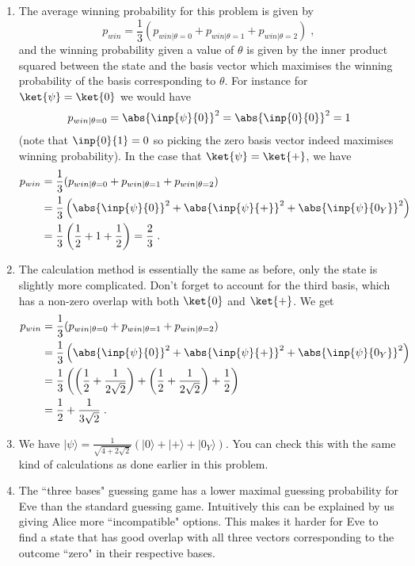 \begin{exercises}
\begin{enumerate}
\item The average winning probability for this problem is given by \[p_{win} = \frac{1}{3}(p_{win|\theta = 0} + p_{win|\theta = 1}+ p_{win|\theta = 2})\;,\] and the winning probability given a value of \(\theta\) is given by the inner product squared between the state and the basis vector which maximises the winning probability of the basis corresponding to \(\theta\). For instance for \(\ket{\psi} = \ket{0}\) we would have \[p_{win|\theta =0} = \abs{\inp{\psi}{0}}^2 = \abs{\inp{0}{0}}^2 = 1\] (note that \(\inp{0}{1}=0\) so picking the zero basis vector indeed maximises winning probability). In the case that $\ket{\psi}=\ket{+}$, we have
\begin{align*}
	p_{win} &= \frac{1}{3}(p_{win|\theta = 0} + p_{win|\theta = 1}+ p_{win|\theta = 2}) \\
	&=\frac{1}{3}\left(\abs{\inp{\psi}{0}}^2+\abs{\inp{\psi}{+}}^2+\abs{\inp{\psi}{0_Y}}^2 \right) \\
	&=\frac{1}{3}\left(\frac{1}{2}+1+\frac{1}{2} \right)=\frac{2}{3}\;.
\end{align*}

\item The calculation method is essentially the same as before, only the state is slightly more complicated. Don't forget to account for the third basis, which has a non-zero overlap with both \(\ket{0}\) and \(\ket{+}\). We get
\begin{align*}
	p_{win} &= \frac{1}{3}(p_{win|\theta = 0} + p_{win|\theta = 1}+ p_{win|\theta = 2}) \\
	&=\frac{1}{3}\left(\abs{\inp{\psi}{0}}^2+\abs{\inp{\psi}{+}}^2+\abs{\inp{\psi}{0_Y}}^2 \right) \\
	&=\frac{1}{3}\left(\left(\frac{1}{2}+\frac{1}{2\sqrt{2}}\right)+\left(\frac{1}{2}+\frac{1}{2\sqrt{2}}\right)+\frac{1}{2}\right) \\
	&=\frac{1}{2}+\frac{1}{3\sqrt{2}}\;.
\end{align*}

\item We have \(|\psi\rangle = \frac{1}{\sqrt{4+2\sqrt{2}}}(|0\rangle +|+\rangle +|0_Y\rangle)\). You can check this with the same kind of calculations as done earlier in this problem.

\item The ``three bases" guessing game has a lower maximal guessing probability for Eve than the standard guessing game. Intuitively this can be explained by us giving Alice more ``incompatible" options. This makes it harder for Eve to find a state that has good overlap with all three vectors corresponding to the outcome ``zero" in their respective bases.
\end{enumerate}
\end{exercises}